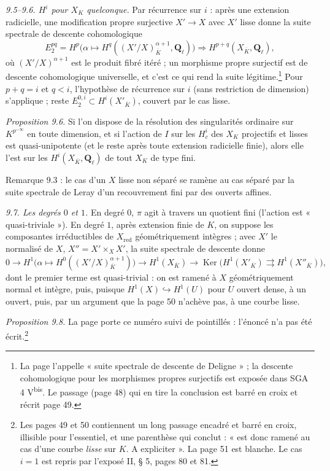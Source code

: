 \documentclass[11pt,a4paper]{article}
\begin{document}
\emph{9.5--9.6. $H^i$ pour $X_K$ quelconque.} Par récurrence sur $i$ : après une
extension radicielle, une modification propre surjective $X' \to X$ avec $X'$
lisse donne la suite spectrale de descente cohomologique
\[
  E_2^{pq} = H^p\bigl(\alpha \mapsto H^q((X'/X)^{\alpha+1}_{\overline K},
  \mathbf{Q}_\ell)\bigr) \Longrightarrow H^{p+q}(X_{\overline K}, \mathbf{Q}_\ell),
\]
où $(X'/X)^{\alpha+1}$ est le produit fibré itéré ; un morphisme propre
surjectif est de descente cohomologique universelle, et c'est ce qui rend
la suite légitime.\footnote{La page l'appelle « suite spectrale de descente de
Deligne » ; la descente cohomologique pour les morphismes propres surjectifs est
exposée dans SGA 4 V\textsuperscript{bis}. Le passage (page 48) qui en tire la
conclusion est barré en croix et récrit page 49.} Pour $p + q = i$ et $q < i$,
l'hypothèse de récurrence sur $i$ (sans restriction de dimension) s'applique ;
reste $E_2^{0,i} \subset H^i(X'_{\overline K})$, couvert par le cas lisse.

\emph{Proposition 9.6.} Si l'on dispose de la résolution des singularités
ordinaire sur $K^{p^{-\infty}}$ en toute dimension, et si l'action de $I$ sur
les $H^i_c$ des $X_K$ projectifs et lisses est quasi-unipotente (et le reste
après toute extension radicielle finie), alors elle l'est sur les
$H^i(X_{\overline K}, \mathbf{Q}_\ell)$ de tout $X_K$ de type fini.

Remarque 9.3 : le cas d'un $X$ lisse non séparé se ramène au cas séparé par la
suite spectrale de Leray d'un recouvrement fini par des ouverts affines.

\emph{9.7. Les degrés $0$ et $1$.} En degré $0$, $\pi$ agit à travers un
quotient fini (l'action est « quasi-triviale »). En degré $1$, après extension
finie de $K$, on suppose les composantes irréductibles de $X_{\mathrm{red}}$
géométriquement intègres ; avec $X'$ le normalisé de $X$, $X'' = X' \times_X X'$,
la suite spectrale de descente donne
\[
  0 \to H^1\bigl(\alpha \mapsto H^0((X'/X)^{\alpha+1}_{\overline K})\bigr) \to
  H^1(X_{\overline K}) \to
  \operatorname{Ker}\bigl(H^1(X'_{\overline K}) \rightrightarrows H^1(X''_{\overline K})\bigr),
\]
dont le premier terme est quasi-trivial : on est ramené à $X$ géométriquement
normal et intègre, puis, puisque $H^1(X) \hookrightarrow H^1(U)$ pour $U$ ouvert
dense, à un ouvert, puis, par un argument que la page 50 n'achève pas, à
une courbe lisse.

\emph{Proposition 9.8.} La page porte ce numéro suivi de pointillés : l'énoncé
n'a pas été écrit.\footnote{Les pages 49 et 50 contiennent un long passage
encadré et barré en croix, illisible pour l'essentiel, et une parenthèse qui
conclut : « est donc ramené au cas d'une courbe \emph{lisse} sur $K$. A
expliciter ». La page 51 est blanche. Le cas $i = 1$ est repris par l'exposé II,
§ 5, pages 80 et 81.}
\end{document}
